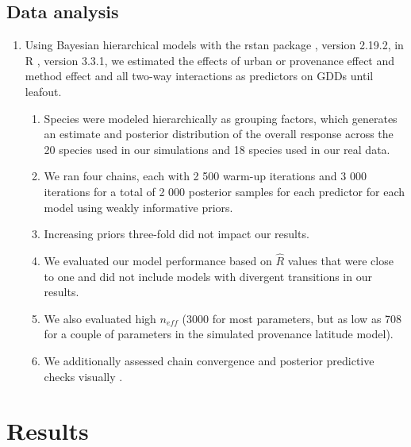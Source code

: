 \documentclass{article}\usepackage[]{graphicx}\usepackage[]{color}
\begin{document}
\subsection*{Data analysis}
\begin{enumerate}
\item Using Bayesian hierarchical models with the rstan package \citep{rstan2019}, version 2.19.2,  in R \citep{R}, version 3.3.1, we estimated the effects of urban or provenance effect and method effect and all two-way interactions as predictors on GDDs until leafout. 
  \begin{enumerate} 
  \item Species were modeled hierarchically as grouping factors, which generates an estimate and posterior distribution of the overall response across the 20 species used in our simulations and 18 species used in our real data.
  \item We ran four chains, each with 2 500 warm-up iterations and 3 000 iterations for a total of 2 000 posterior samples for each predictor for each model using weakly informative priors.
  \item Increasing priors three-fold did not impact our results.
  \item We evaluated our model performance based on $\hat{R}$ values that were close to one and did not include models with divergent transitions in our results. 
  \item We also evaluated high $n_{eff}$ (3000 for most parameters, but as low as 708 for a couple of parameters in the simulated provenance latitude model). 
  \item We additionally assessed chain convergence and posterior predictive checks visually \citep{BDA}.
  \end{enumerate}
\end{enumerate}

\section*{Results}
\end{document}
